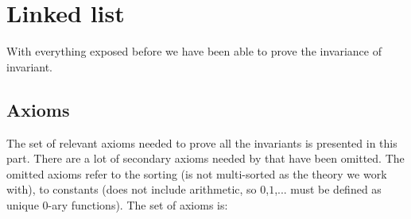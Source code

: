 \section{Linked list}
\label{proof:Preserve}

With everything exposed before we have been able to prove the invariance of \invPreserve invariant.
%


\subsection{Axioms}

The set of relevant axioms needed to prove all the invariants is presented in this part.
%
There are a lot of secondary axioms needed by \spass that have been omitted. 
%
The omitted axioms refer to the sorting (\spass is not multi-sorted as the theory we work with), to constants (\spass does not include arithmetic, so $0$,$1$,... must be defined as unique 0-ary functions). 
%
The set of axioms is:

\begin{description}

\end{description}

